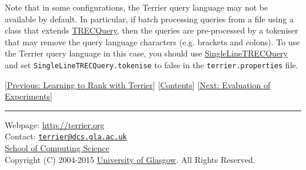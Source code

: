 Note that in some configurations, the Terrier query language may not be
available by default. In particular, if batch processing queries from a
file using a class that extends
\href{javadoc/org/terrier/applications/batchquerying/TRECQuery.html}{TRECQuery},
then the queries are pre-processed by a tokeniser that may remove the
query language characters (e.g. brackets and colons). To use the Terrier
query language in this case, you should use
\href{javadoc/org/terrier/applications/batchquerying/SingleLineTRECQuery.html}{SingleLineTRECQuery}
and set \texttt{SingleLineTRECQuery.tokenise} to false in the
\texttt{terrier.properties} file.

{[}\href{learning.html}{Previous: Learning to Rank with Terrier}{]}
{[}\href{index.html}{Contents}{]} {[}\href{evaluation.html}{Next:
Evaluation of Experiments}{]}

\begin{center}\rule{0.5\linewidth}{\linethickness}\end{center}

Webpage: \url{http://terrier.org}\\
Contact:
\href{mailto:terrier@dcs.gla.ac.uk}{\nolinkurl{terrier@dcs.gla.ac.uk}}\\
\href{http://www.dcs.gla.ac.uk/}{School of Computing Science}\\
Copyright (C) 2004-2015 \href{http://www.gla.ac.uk/}{University of
Glasgow}. All Rights Reserved.
